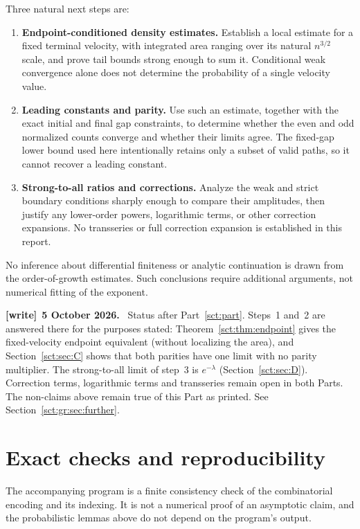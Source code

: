 \documentclass[11pt,letterpaper]{article}
\theoremstyle{definition}\newtheorem{remark}[theorem]{Remark}
\newenvironment{writenote}[1][]{\par\smallskip\begingroup\small
 \noindent\textbf{[write]}\if\relax\detokenize{#1}\relax\else~\textbf{#1.}\fi\ }%
 {\par\endgroup\smallskip}
\begin{document}
Three natural next steps are:
\begin{enumerate}
 \item \textbf{Endpoint-conditioned density estimates.}
 Establish a local estimate for a fixed terminal velocity, with integrated
 area ranging over its natural $n^{3/2}$ scale, and prove tail bounds strong
 enough to sum it. Conditional weak convergence alone does not determine
 the probability of a single velocity value.
 \item \textbf{Leading constants and parity.}
 Use such an estimate, together with the exact initial and final gap
 constraints, to determine whether the even and odd normalized counts
 converge and whether their limits agree. The fixed-gap lower bound used
 here intentionally retains only a subset of valid paths, so it cannot
 recover a leading constant.
 \item \textbf{Strong-to-all ratios and corrections.}
 Analyze the weak and strict boundary conditions sharply enough to compare
 their amplitudes, then justify any lower-order powers, logarithmic terms,
 or other correction expansions. No transseries or full correction
 expansion is established in this report.
\end{enumerate}

No inference about differential finiteness or analytic continuation is drawn
from the order-of-growth estimates. Such conclusions require additional
arguments, not numerical fitting of the exponent.
\begin{writenote}[5 October 2026]
Status after Part~\ref{sct:part}. Steps~1 and~2 are answered there for the purposes stated: Theorem~\ref{sct:thm:endpoint} gives the fixed-velocity endpoint equivalent (without localizing the area), and Section~\ref{sct:sec:C} shows that both parities have one limit with no parity multiplier. The strong-to-all limit of step~3 is $e^{-\lambda}$ (Section~\ref{sct:sec:D}). Correction terms, logarithmic terms and transseries remain open in both Parts. The non-claims above remain true of this Part as printed. See Section~\ref{sct:gr:sec:further}.
\end{writenote}

\section{Exact checks and reproducibility}\label{sct:gr:sec:checks}

The accompanying program is a finite consistency check of the combinatorial
encoding and its indexing. It is not a numerical proof of an asymptotic claim,
and the probabilistic lemmas above do not depend on the program's output.
\end{document}

